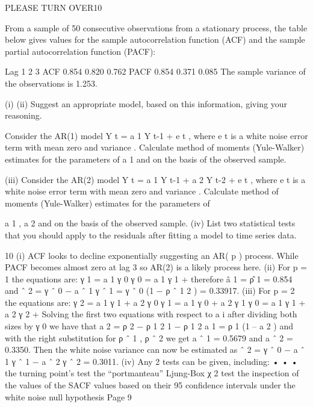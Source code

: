 \documentclass[a4paper,12pt]{article}
\begin{document}
PLEASE TURN OVER10

From a sample of 50 consecutive observations from a stationary process, the table below gives values for the sample autocorrelation function (ACF) and the sample
partial autocorrelation function (PACF):

Lag
1
2
3
ACF
0.854
0.820
0.762
PACF
0.854
0.371
0.085
The sample variance of the observations is 1.253.

(i)
(ii)
Suggest an appropriate model, based on this information, giving your
reasoning.

Consider the AR(1) model
Y t = a 1 Y t-1 + e t ,
where e t is a white noise error term with mean zero and variance  .
Calculate method of moments (Yule-Walker) estimates for the parameters of
a 1 and  on the basis of the observed sample.

(iii)
Consider the AR(2) model
Y t = a 1 Y t-1 + a 2 Y t-2 + e t ,
where e t is a white noise error term with mean zero and variance  .
Calculate method of moments (Yule-Walker) estimates for the parameters of

a 1 , a 2 and  on the basis of the observed sample.
(iv)
List two statistical tests that you should apply to the residuals after fitting a model to time series data.



10
(i) ACF looks to decline exponentially suggesting an AR( p ) process. While
PACF becomes almost zero at lag 3 so AR(2) is a likely process here.
(ii) For p = 1 the equations are:
γ 1 = a 1 γ 0
γ 0 = a 1 γ 1 + 
therefore â 1 = ρ̂ 1 = 0.854 and \sigma ˆ 2 = γ ˆ 0 − a ˆ 1 γ ˆ 1 = γ ˆ 0 (1 − ρ ˆ 1 2 ) = 0.33917.
(iii)
For p = 2 the equations are:
γ 2 = a 1 γ 1 + a 2 γ 0
γ 1 = a 1 γ 0 + a 2 γ 1
γ 0 = a 1 γ 1 + a 2 γ 2 + 
Solving the first two equations with respect to a i after dividing both sizes by γ 0
we have that
a 2 =
ρ 2 − ρ 1 2
1 − ρ 1 2
a 1 = ρ 1 (1 – a 2 )
and with the right substitution for ρ ˆ 1 , ρ ˆ 2 we get a ˆ 1 = 0.5679 and a ˆ 2 = 0.3350.
Then the white noise variance can now be estimated as
\sigma ˆ 2 = γ ˆ 0 − a ˆ 1 γ ˆ 1 − a ˆ 2 γ ˆ 2 = 0.3011.
(iv)
Any 2 tests can be given, including:
•
•
•
the turning point’s test
the “portmanteau” Ljung-Box χ 2 test
the inspection of the values of the SACF values based on their 95%
confidence intervals under the white noise null hypothesis
Page 9%
\end{document}
